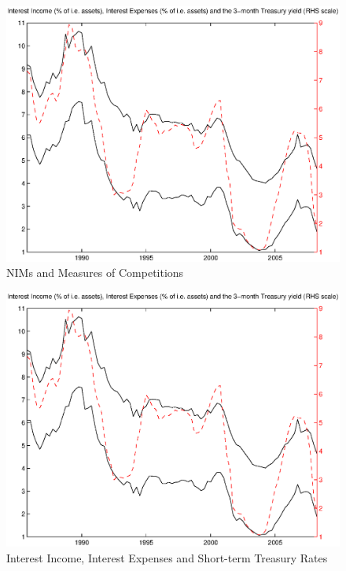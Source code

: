 \documentclass[12pt]{article}
\begin{document}
\begin{figure}[tbp]
\caption{NIMs and Measures of Competitions} \label{figure_nims_competition}
\center
\includegraphics[scale=0.85]{figure_nims_competition.ps}
\end{figure}

\begin{figure}[tbp]
\caption{Interest Income, Interest Expenses and Short-term Treasury Rates} \label{figure_nims_components}
\center
\includegraphics[scale=0.85]{figure_nims_components.ps}
\end{figure}
\end{document}
